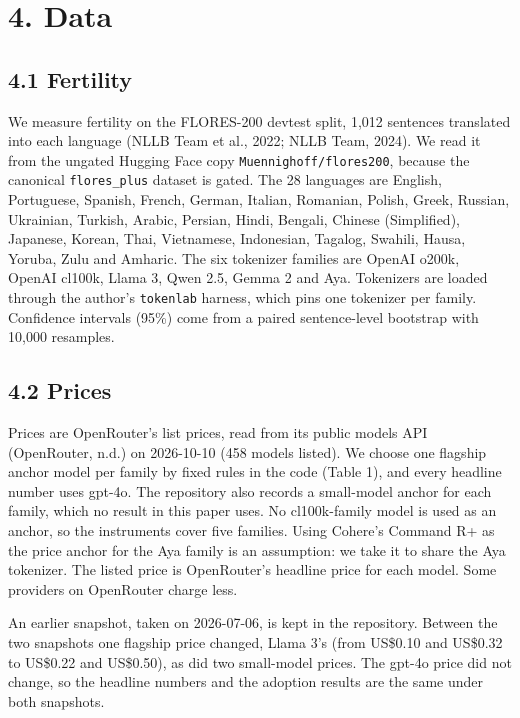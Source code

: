 \documentclass[11pt]{article}
\begin{document}
\section{4. Data}

\subsection{4.1 Fertility}

We measure fertility on the FLORES-200 devtest split, 1,012 sentences translated into each language (NLLB Team et al., 2022; NLLB Team, 2024). We read it from the ungated Hugging Face copy \texttt{Muennighoff/flores200}, because the canonical \texttt{flores\_plus} dataset is gated. The 28 languages are English, Portuguese, Spanish, French, German, Italian, Romanian, Polish, Greek, Russian, Ukrainian, Turkish, Arabic, Persian, Hindi, Bengali, Chinese (Simplified), Japanese, Korean, Thai, Vietnamese, Indonesian, Tagalog, Swahili, Hausa, Yoruba, Zulu and Amharic. The six tokenizer families are OpenAI o200k, OpenAI cl100k, Llama 3, Qwen 2.5, Gemma 2 and Aya. Tokenizers are loaded through the author's \texttt{tokenlab} harness, which pins one tokenizer per family. Confidence intervals (95\%) come from a paired sentence-level bootstrap with 10,000 resamples.

\subsection{4.2 Prices}

Prices are OpenRouter's list prices, read from its public models API (OpenRouter, n.d.) on 2026-10-10 (458 models listed). We choose one flagship anchor model per family by fixed rules in the code (Table 1), and every headline number uses gpt-4o. The repository also records a small-model anchor for each family, which no result in this paper uses. No cl100k-family model is used as an anchor, so the instruments cover five families. Using Cohere's Command R+ as the price anchor for the Aya family is an assumption: we take it to share the Aya tokenizer. The listed price is OpenRouter's headline price for each model. Some providers on OpenRouter charge less.

An earlier snapshot, taken on 2026-07-06, is kept in the repository. Between the two snapshots one flagship price changed, Llama 3's (from US\$0.10 and US\$0.32 to US\$0.22 and US\$0.50), as did two small-model prices. The gpt-4o price did not change, so the headline numbers and the adoption results are the same under both snapshots.
\end{document}
